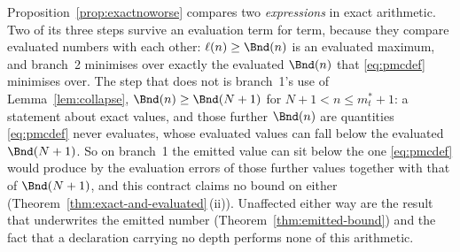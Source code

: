 
\begin{remark}
\label{rem:noworsefl}
Proposition~\ref{prop:exactnoworse} compares two \emph{expressions} in exact
arithmetic. Two of its three steps survive an evaluation term for term,
because they compare evaluated numbers with each other: $\ell(n)\ge\Bnd(n)$
is an evaluated maximum, and branch~2 minimises over exactly the evaluated
$\Bnd(n)$ that \eqref{eq:pmcdef} minimises over. The step that does not is
branch~1's use of Lemma~\ref{lem:collapse},
$\Bnd(n)\ge\Bnd(N+1)$ for $N+1<n\le m^{\ast}_t+1$: a statement about exact
values, and those further $\Bnd(n)$ are quantities \eqref{eq:pmcdef} never
evaluates, whose evaluated values can fall below the evaluated $\Bnd(N+1)$.
So on branch~1 the emitted value can sit below the one \eqref{eq:pmcdef}
would produce by the evaluation errors of those further values together with
that of $\Bnd(N+1)$, and this contract claims no bound on either
(Theorem~\ref{thm:exact-and-evaluated}\,(ii)). Unaffected either way are the
result that underwrites the emitted number (Theorem~\ref{thm:emitted-bound}) and
the fact that a declaration carrying no depth performs none of this
arithmetic.
\end{remark}
